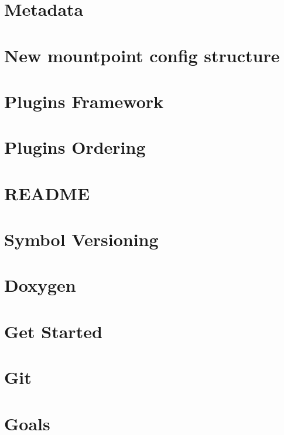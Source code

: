 \let\mypdfximage\pdfximage\def\pdfximage{\immediate\mypdfximage}\documentclass[twoside]{book}
\newcommand{\+}{\discretionary{\mbox{\scriptsize$\hookleftarrow$}}{}{}}
\begin{document}
\chapter{Metadata}
\label{doc_dev_metadata_md}

\chapter{New mountpoint config structure}
\label{doc_dev_mountpoints_md}

\chapter{Plugins Framework}
\label{doc_dev_plugins-framework_md}

\chapter{Plugins Ordering}
\label{doc_dev_plugins-ordering_md}

\chapter{README}
\label{md_doc_dev_README}

\chapter{Symbol Versioning}
\label{doc_dev_symbol-versioning_md}

\chapter{Doxygen}
\label{doc_doxygen_README_md}

\chapter{Get Started}
\label{doc_GETSTARTED_md}

\chapter{Git}
\label{doc_Git_md}

\chapter{Goals}
\label{doc_GOALS_md}

\end{document}
